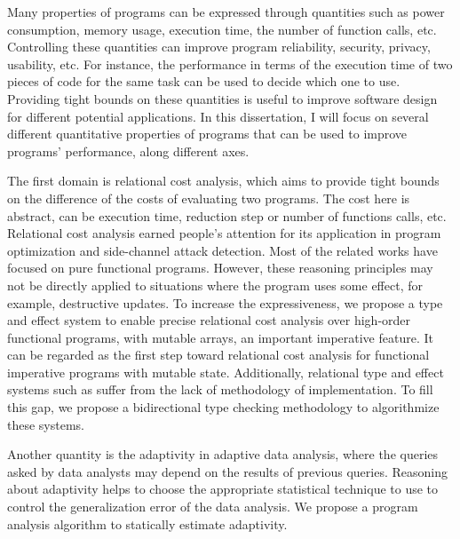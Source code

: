 \begin{abstractpage}
Many properties of programs can be expressed through quantities such as power consumption, memory usage, execution time, the number of function calls, etc. Controlling these quantities can improve program reliability, security, privacy, usability, etc. For instance, the performance in terms of the execution time of two pieces of code for the same task can be used to decide which one to use. Providing tight bounds on these quantities is useful to improve software design for different potential applications. 
In this dissertation, I will focus on several different quantitative properties of programs that can be used to improve programs’ performance, along different axes.

The first domain is relational cost analysis, which aims to provide tight bounds on the difference of the costs of evaluating two programs. The cost here is abstract, can be execution time, reduction step or number of functions calls, etc. Relational cost analysis earned people's attention for its application in program optimization and side-channel attack detection. Most of the related works have focused on pure functional programs. However, these reasoning principles may not be directly applied to situations where the program uses some effect, for example, destructive updates. To increase the expressiveness, we propose a type and effect system {\Arel} to enable precise relational cost analysis over high-order functional programs, with mutable arrays, an important imperative feature. It can be regarded as the first step toward relational cost analysis for functional imperative programs with mutable state. Additionally, relational type and effect systems such as {\Arel} suffer from the lack of methodology of implementation. To fill this gap, we propose a bidirectional type checking methodology to algorithmize these systems. 

Another quantity is the adaptivity in adaptive data analysis, where the queries asked by data analysts may depend on the results of previous queries.  Reasoning about adaptivity helps to choose the appropriate statistical technique to use to control the generalization error of the data analysis. We propose a program analysis algorithm to statically estimate adaptivity.
\end{abstractpage}
